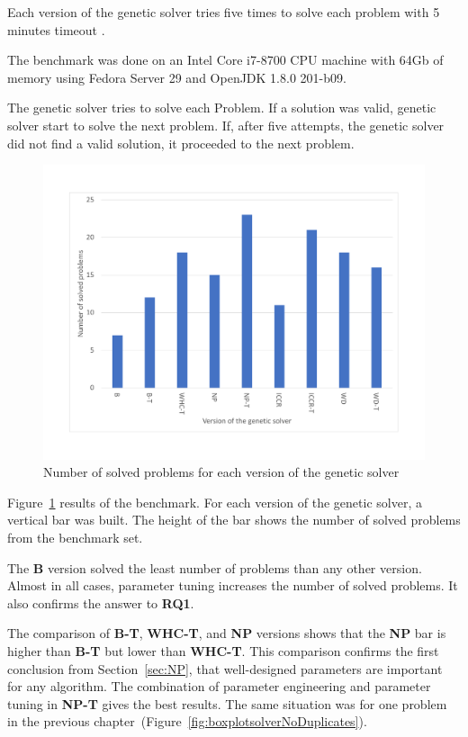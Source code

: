 Each version of the genetic solver tries five times to solve each problem with 5 minutes timeout .

The benchmark was done on an Intel Core i7-8700 CPU machine with 64Gb of memory using Fedora Server 29 and OpenJDK 1.8.0 201-b09.

The genetic solver tries to solve each Problem. If a solution was valid, genetic solver start to solve the next problem. If, after five attempts, the genetic solver did not find a valid solution, it proceeded to the next problem.

\begin{figure}
	\centering
	\includegraphics[width=\textwidth]{images/EvaluationNumberOfSolvedProblems.pdf}
	\caption[Number of problems for each version of the genetic solver]{Number of solved problems for each version of the genetic solver}
	\label{fig:EvaluationNumberOfSolvedProblems}
\end{figure}

Figure~\ref{fig:EvaluationNumberOfSolvedProblems} results of the benchmark. For each version of the genetic solver, a vertical bar was built. The height of the bar shows the number of solved problems from the benchmark set. 

The \textbf{B} version solved the least number of problems than any other version. Almost in all cases, parameter tuning increases the number of solved problems. It also confirms the answer to \textbf{RQ1}. 

The comparison of \textbf{B-T}, \textbf{WHC-T}, and \textbf{NP} versions shows that the \textbf{NP} bar is higher than \textbf{B-T} but lower than \textbf{WHC-T}. This comparison confirms the first conclusion from Section~\ref{sec:NP}, that well-designed parameters are important for any algorithm. The combination of parameter engineering and parameter tuning in \textbf{NP-T} gives the best results. The same situation was for one problem in the previous chapter~(Figure~\ref{fig:boxplotsolverNoDuplicates}). 

